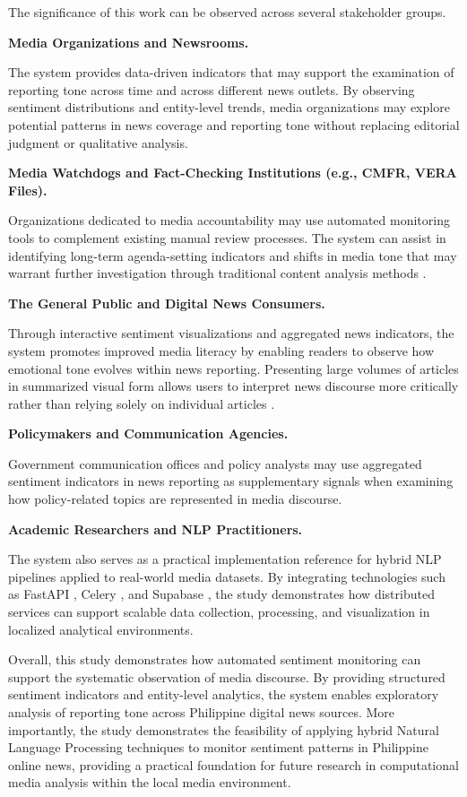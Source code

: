 The significance of this work can be observed across several stakeholder groups.

\textbf{Media Organizations and Newsrooms.}

The system provides data-driven indicators that may support the examination of reporting tone across time and across different news outlets. By observing sentiment distributions and entity-level trends, media organizations may explore potential patterns in news coverage and reporting tone without replacing editorial judgment or qualitative analysis.

\textbf{Media Watchdogs and Fact-Checking Institutions (e.g., CMFR, VERA Files).}

Organizations dedicated to media accountability may use automated monitoring tools to complement existing manual review processes. The system can assist in identifying long-term agenda-setting indicators and shifts in media tone that may warrant further investigation through traditional content analysis methods \cite{ref11}.

\textbf{The General Public and Digital News Consumers.}

Through interactive sentiment visualizations and aggregated news indicators, the system promotes improved media literacy by enabling readers to observe how emotional tone evolves within news reporting. Presenting large volumes of articles in summarized visual form allows users to interpret news discourse more critically rather than relying solely on individual articles \cite{ref34}.

\textbf{Policymakers and Communication Agencies.}

Government communication offices and policy analysts may use aggregated sentiment indicators in news reporting as supplementary signals when examining how policy-related topics are represented in media discourse.

\textbf{Academic Researchers and NLP Practitioners.}

The system also serves as a practical implementation reference for hybrid NLP pipelines applied to real-world media datasets. By integrating technologies such as FastAPI \cite{ref27}, Celery \cite{ref29}, and Supabase \cite{ref19}, the study demonstrates how distributed services can support scalable data collection, processing, and visualization in localized analytical environments.

Overall, this study demonstrates how automated sentiment monitoring can support the systematic observation of media discourse. By providing structured sentiment indicators and entity-level analytics, the system enables exploratory analysis of reporting tone across Philippine digital news sources. More importantly, the study demonstrates the feasibility of applying hybrid Natural Language Processing techniques to monitor sentiment patterns in Philippine online news, providing a practical foundation for future research in computational media analysis within the local media environment.

